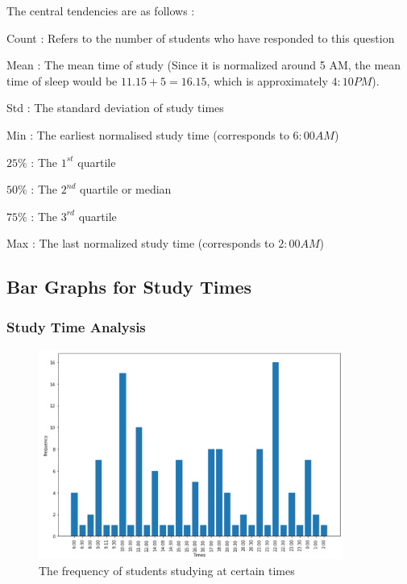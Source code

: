 \documentclass[11pt,]{beamer}
\begin{document}
\begin{frame}

    The central tendencies are as follows : 
    
    \begin{block}
    
    Count : Refers to the number of students who have responded to this question
    
    \smallskip
    
    Mean : The mean time of study (Since it is normalized around 5 AM, the mean time of sleep would be $11.15 + 5 = 16.15$, which is approximately $4:10 PM$).
    
    \smallskip
    
    Std : The standard deviation of study times 
    
    \smallskip
    
    Min : The earliest normalised study time (corresponds to $6:00 AM$)
    
    \smallskip
    
    $25\%$ : The $1^{st}$ quartile
    
    \smallskip
    
    $50\%$ : The $2^{nd}$ quartile or median
    
    \smallskip
    
    $75\%$ : The $3^{rd}$ quartile 
    
    \smallskip
    
    Max : The last normalized study time (corresponds to $2:00 AM$) 
    
    \end{block}

\end{frame}

\subsection{Bar Graphs for Study Times}

\begin{frame}

    \frametitle{Study Time Analysis}
    
	\begin{figure}
		\includegraphics[width=10cm]{Bimodal.png}
		\caption{The frequency of students studying at certain times}
	\end{figure}
	
\end{frame}
\end{document}

